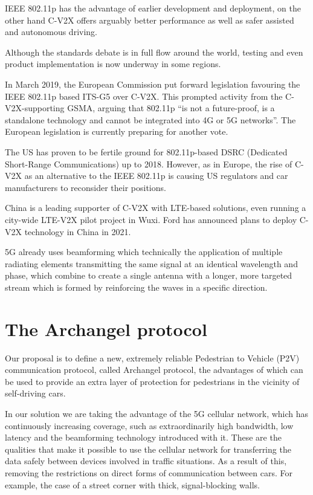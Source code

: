 \documentclass[conference]{IEEEtran}
\begin{document}
IEEE 802.11p has the advantage of earlier development and deployment, on the other hand C-V2X offers arguably better performance as well as safer assisted and autonomous driving.

Although the standards debate is in full flow around the world, testing and even product implementation is now underway in some regions.

In March 2019, the European Commission put forward legislation favouring the IEEE 802.11p based ITS-G5 over C-V2X. This prompted activity from the C-V2X-supporting GSMA, arguing that 802.11p “is not a future-proof, is a standalone technology and cannot be integrated into 4G or 5G networks”. The European legislation is currently preparing for another vote.

The US has proven to be fertile ground for 802.11p-based DSRC (Dedicated Short-Range Communications) up to 2018. However,  as in Europe, the rise of C-V2X as an alternative to the IEEE 802.11p is causing US regulators and car manufacturers to reconsider their positions.

China is a leading supporter of C-V2X with LTE-based solutions, even running a city-wide LTE-V2X pilot project in Wuxi. Ford has announced plans to deploy C-V2X technology in China in 2021.

5G already uses beamforming which technically the application of multiple radiating elements transmitting the same signal at an identical wavelength and phase, which combine to create a single antenna with a longer, more targeted stream which is formed by reinforcing the waves in a specific direction.

\section{The Archangel protocol}
Our proposal is to define a new, extremely reliable Pedestrian to Vehicle (P2V) communication protocol, called Archangel protocol, the advantages of which can be used to provide an extra layer of protection for pedestrians in the vicinity of self-driving cars.

In our solution we are taking the advantage of the 5G cellular network, which has continuously increasing coverage, such as extraordinarily high bandwidth, low latency and the beamforming technology introduced with it. These are the qualities that make it possible to use the cellular network for transferring the data safely between devices involved in traffic situations. As a result of this, removing the restrictions on direct forms of communication between cars. For example, the case of a street corner with thick, signal-blocking walls.
\end{document}
